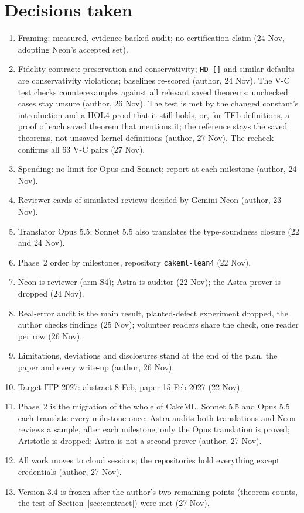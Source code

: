 \documentclass[11pt,a4paper]{article}
\newcommand{\code}[1]{\texttt{#1}}
\begin{document}
\section{Decisions taken}
\begin{enumerate}
\item Framing: measured, evidence-backed audit; no certification claim (24 Nov, adopting Neon's accepted set).
\item Fidelity contract: preservation and conservativity; \code{HD []} and similar defaults are conservativity violations; baselines re-scored (author, 24 Nov). The V-C test checks counterexamples against all relevant saved theorems; unchecked cases stay unsure (author, 26 Nov). The test is met by the changed constant's introduction and a HOL4 proof that it still holds, or, for TFL definitions, a proof of each saved theorem that mentions it; the reference stays the saved theorems, not unsaved kernel definitions (author, 27 Nov). The recheck confirms all 63 V-C pairs (27 Nov).
\item Spending: no limit for Opus and Sonnet; report at each milestone (author, 24 Nov).
\item Reviewer cards of simulated reviews decided by Gemini Neon (author, 23 Nov).
\item Translator Opus 5.5; Sonnet 5.5 also translates the type-soundness closure (22 and 24 Nov).
\item Phase~2 order by milestones, repository \code{cakeml-lean4} (22 Nov).
\item Neon is reviewer (arm S4); Astra is auditor (22 Nov); the Astra prover is dropped (24 Nov).
\item Real-error audit is the main result, planted-defect experiment dropped, the author checks findings (25 Nov); volunteer readers share the check, one reader per row (26 Nov).
\item Limitations, deviations and disclosures stand at the end of the plan, the paper and every write-up (author, 26 Nov).
\item Target ITP 2027: abstract 8 Feb, paper 15 Feb 2027 (22 Nov).
\item Phase~2 is the migration of the whole of CakeML. Sonnet 5.5 and Opus 5.5 each translate every milestone once; Astra audits both translations and Neon reviews a sample, after each milestone; only the Opus translation is proved; Aristotle is dropped; Astra is not a second prover (author, 27 Nov).
\item All work moves to cloud sessions; the repositories hold everything except credentials (author, 27 Nov).
\item Version 3.4 is frozen after the author's two remaining points (theorem counts, the test of Section~\ref{sec:contract}) were met (27 Nov).
\end{enumerate}
\end{document}
